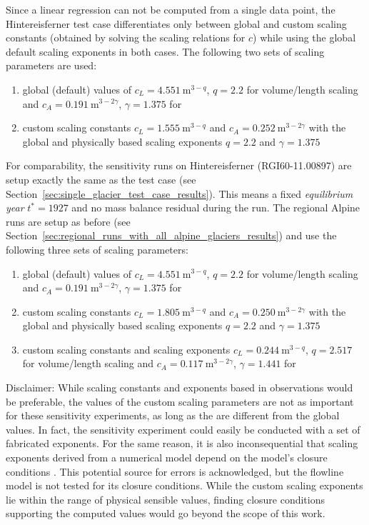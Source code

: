         Since a linear regression can not be computed from a single data point, the Hintereisferner test case differentiates only between global and custom scaling constants (obtained by solving the scaling relations for $c$) while using the global default scaling exponents in both cases. The following two sets of scaling parameters are used:
        \begin{enumerate}[label=(\alph*)]
            \item global (default) values of $c_L = \SI{4.551}{\meter^{3-q}}$, $q = 2.2$ for volume/length scaling and $c_A = \SI{0.191}{\meter^{3-2\gamma}}$, $\gamma = 1.375$ for \vas{}
            \item custom scaling constants $c_L = \SI{1.555}{\meter^{3-q}}$ and $c_A = \SI{0.252}{\meter^{3-2\gamma}}$ with the global and physically based scaling exponents $q = 2.2$ and $\gamma = 1.375$
        \end{enumerate}
        For comparability, the sensitivity runs on Hintereisferner (RGI60-11.00897) are setup exactly the same as the test case (see Section~\ref{sec:single_glacier_test_case_results}). This means a fixed \textit{equilibrium year} $t^{*} = 1927$ and no mass balance residual during the run. The regional Alpine runs are setup as before (see Section~\ref{sec:regional_runs_with_all_alpine_glaciers_results}) and use the following three sets of scaling parameters:
        \begin{enumerate}[label=(\alph*)]
            \item global (default) values of $c_L = \SI{4.551}{\meter^{3-q}}$, $q = 2.2$ for volume/length scaling and $c_A = \SI{0.191}{\meter^{3-2\gamma}}$, $\gamma = 1.375$ for \vas{}
            \item custom scaling constants $c_L = \SI{1.805}{\meter^{3-q}}$ and $c_A = \SI{0.250}{\meter^{3-2\gamma}}$ with the global and physically based scaling exponents $q = 2.2$ and $\gamma = 1.375$
            \item custom scaling constants and scaling exponents $c_L = \SI{0.244}{\meter^{3-q}}$, $q = 2.517$ for volume/length scaling and $c_A = \SI{0.117}{\meter^{3-2\gamma}}$, $\gamma = 1.441$ for \vas{}
        \end{enumerate}

        Disclaimer: While scaling constants and exponents based in observations would be preferable, the values of the custom scaling parameters are not as important for these sensitivity experiments, as long as the are different from the global values. In fact, the sensitivity experiment could easily be conducted with a set of fabricated exponents. For the same reason, it is also inconsequential that scaling exponents derived from a numerical model depend on the model's closure conditions \citep[Section 8.9]{Bahr2015}. This potential source for errors is acknowledged, but the flowline model is not tested for its closure conditions. While the custom scaling exponents lie within the range of physical sensible values, finding closure conditions supporting the computed values would go beyond the scope of this work.


